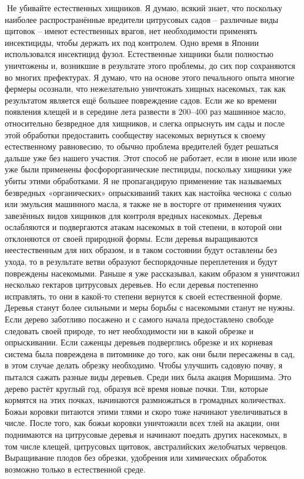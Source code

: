 \documentclass[a4paper]{book}
\begin{document}
Не убивайте естественных хищников.
Я думаю, всякий знает, что поскольку наиболее распространённые вредители
цитрусовых садов – различные виды щитовок – имеют естественных врагов, нет
необходимости применять инсектициды, чтобы держать их под контролем. Одно время в
Японии использовался инсектицид фузол. Естественные хищники были полностью
уничтожены и, возникшие в результате этого проблемы, до сих пор сохраняются во многих
префектурах. Я думаю, что на основе этого печального опыта многие фермеры осознали, что
нежелательно уничтожать хищных насекомых, так как результатом является ещё большее
повреждение садов.
Если же ко времени появления клещей и в середине лета развести в 200–400 раз
машинное масло, относительно безвредное для хищников, и слегка опрыснуть им сады и
после этой обработки предоставить сообществу насекомых вернуться к своему
естественному равновесию, то обычно проблема вредителей будет решаться дальше уже без
нашего участия. Этот способ не работает, если в июне или июле уже были применены
фосфорорганические пестициды, поскольку хищники уже убиты этими обработками.
Я не пропагандирую применение так называемых безвредных «органических»
опрыскиваний таких как настойка чеснока с солью или эмульсия машинного масла, я также
не в восторге от применения чужих завезённых видов хищников для контроля вредных
насекомых. Деревья ослабляются и подвергаются атакам насекомых в той степени, в которой
они отклоняются от своей природной формы. Если деревья выращиваются неестественным
для них образом, и в таком состоянии будут оставлены без ухода, то в результате ветви
образуют беспорядочные переплетения и будут повреждены насекомыми. Раньше я уже
рассказывал, каким образом я уничтожил несколько гектаров цитрусовых деревьев. Но если
деревья постепенно исправлять, то они в какой-то степени вернутся к своей естественной
форме. Деревья станут более сильными и меры борьбы с насекомыми станут не нужны. Если
дерево заботливо посажено и с самого начала предоставлено свободе следовать своей
природе, то нет необходимости ни в какой обрезке и опрыскивании. Если саженцы деревьев
подверглись обрезке и их корневая система была повреждена в питомнике до того, как они
были пересажены в сад, в этом случае делать обрезку необходимо.
Чтобы улучшить садовую почву, я пытался сажать разные виды деревьев. Среди них была
акация Моришима. Это дерево растёт круглый год, образуя всё время новые почки. Тли,
которые кормятся на этих почках, начинаются размножаться в громадных количествах.
Божьи коровки питаются этими тлями и скоро тоже начинают увеличиваться в числе. После
того, как божьи коровки уничтожили всех тлей на акации, они поднимаются на цитрусовые
деревья и начинают поедать других насекомых, в том числе клещей, цитрусовых щитовок,
австралийских желобчатых червецов.
Выращивание плодов без обрезки, удобрения или химических обработок возможно
только в естественной среде.
\end{document}
